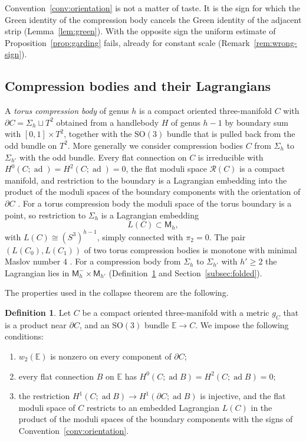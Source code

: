 \documentclass[11pt]{amsart}
\theoremstyle{definition}
\newtheorem{definition}[theorem]{Definition}
\theoremstyle{remark}
\theoremstyle{plain}
\numberwithin{equation}{section}
\newcommand{\ad}{\operatorname{ad}}
\newcommand{\SO}{\mathrm{SO}}
\newcommand{\Msf}{\mathsf{M}}
\begin{document}
Convention~\ref{conv:orientation} is not a matter of taste. It is the
sign for which the Green identity of the compression body cancels the
Green identity of the adjacent strip (Lemma~\ref{lem:green}). With the
opposite sign the uniform estimate of
Proposition~\ref{prop:garding} fails, already for constant scale
(Remark~\ref{rem:wrong-sign}).

\subsection{Compression bodies and their Lagrangians}\label{subsec:compressions}

A \emph{torus compression body} of genus $h$ is a compact oriented
three-manifold $C$ with $\partial C=\Sigma_h\sqcup T^2$ obtained from a
handlebody $H$ of genus $h-1$ by boundary sum with $[0,1]\times T^2$,
together with the $\SO(3)$ bundle that is pulled back from the odd bundle
on $T^2$. More generally we consider compression bodies $C$ from
$\Sigma_h$ to $\Sigma_{h'}$ with the odd bundle. Every flat connection on
$C$ is irreducible with $H^0(C;\ad)=H^2(C;\ad)=0$, the flat moduli space
$\mathcal R(C)$ is a compact manifold, and restriction to the boundary is a
Lagrangian embedding into the product of the moduli spaces of the boundary
components with the orientation of $\partial C$ \cite[Proposition~2.21]{DFL}.
For a torus compression body the moduli space of the torus boundary is a
point, so restriction to $\Sigma_h$ is a Lagrangian embedding
\[
L(C)\subset\Msf_h ,
\]
with $L(C)\cong(S^3)^{h-1}$, simply connected with $\pi_2=0$. The pair
$(L(C_0),L(C_1))$ of two torus compression bodies is monotone with minimal
Maslov number $4$ \cite[Theorem~1]{DFL}. For a compression body from
$\Sigma_h$ to $\Sigma_{h'}$ with $h'\ge2$ the Lagrangian lies in
$\Msf_h^-\times\Msf_{h'}$ (Definition~\ref{def:clean-datum} and
Section~\ref{subsec:folded}).

The properties used in the collapse theorem are the following.

\begin{definition}\label{def:clean-datum}
Let $C$ be a compact oriented three-manifold
with a metric $g_C$ that is a product near $\partial C$, and an
$\SO(3)$ bundle $\mathbb E\to C$. We impose the following conditions:
\begin{enumerate}[label=(C\arabic*)]
\item $w_2(\mathbb E)$ is nonzero on every component of $\partial C$;
\item every flat connection $B$ on $\mathbb E$ has
  $H^0(C;\ad B)=H^2(C;\ad B)=0$;
\item the restriction $H^1(C;\ad B)\to H^1(\partial C;\ad B)$ is
  injective, and the flat moduli space of $C$ restricts to an embedded
  Lagrangian $L(C)$ in the product of the moduli spaces of the
  boundary components with the signs of
  Convention~\ref{conv:orientation}.
\end{enumerate}
\end{definition}
\end{document}
